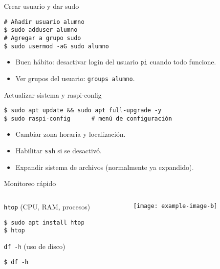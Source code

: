 \documentclass[aspectratio=169, professionalfonts]{beamer}
\begin{document}
\begin{frame}[fragile]{Crear usuario y dar sudo}
\begin{verbatim}
# Añadir usuario alumno
$ sudo adduser alumno
# Agregar a grupo sudo
$ sudo usermod -aG sudo alumno
\end{verbatim}
\begin{itemize}
  \item Buen hábito: desactivar login del usuario \texttt{pi} cuando todo funcione.  
  \item Ver grupos del usuario: \texttt{groups alumno}.  
\end{itemize}
\end{frame}

\begin{frame}[fragile]{Actualizar sistema y raspi-config}
\begin{verbatim}
$ sudo apt update && sudo apt full-upgrade -y
$ sudo raspi-config      # menú de configuración
\end{verbatim}
\begin{itemize}
  \item Cambiar zona horaria y localización.  
  \item Habilitar \texttt{ssh} si se desactivó.  
  \item Expandir sistema de archivos (normalmente ya expandido).  
\end{itemize}
\end{frame}

\begin{frame}[fragile]{Monitoreo rápido}
\begin{columns}[T]
\begin{column}{0.52\textwidth}
\texttt{htop} (CPU, RAM, procesos)  
\begin{verbatim}
$ sudo apt install htop
$ htop
\end{verbatim}

\texttt{df -h} (uso de disco)  
\begin{verbatim}
$ df -h
\end{verbatim}
\end{column}
\begin{column}{0.43\textwidth}
  \texttt{[image: example-image-b]}
\end{column}
\end{columns}
\end{frame}
\end{document}
